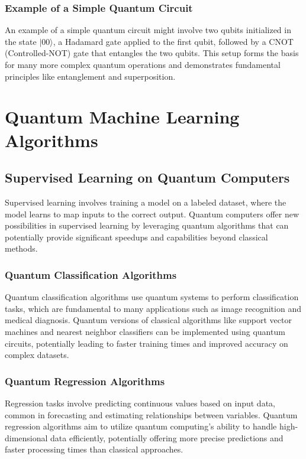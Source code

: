 \documentclass{book}
\begin{document}
\subsubsection{Example of a Simple Quantum Circuit}
An example of a simple quantum circuit might involve two qubits initialized in the state $|00\rangle$, a Hadamard gate applied to the first qubit, followed by a CNOT (Controlled-NOT) gate that entangles the two qubits. This setup forms the basis for many more complex quantum operations and demonstrates fundamental principles like entanglement and superposition.

\section{Quantum Machine Learning Algorithms}

\subsection{Supervised Learning on Quantum Computers}
Supervised learning involves training a model on a labeled dataset, where the model learns to map inputs to the correct output. Quantum computers offer new possibilities in supervised learning by leveraging quantum algorithms that can potentially provide significant speedups and capabilities beyond classical methods.

\subsubsection{Quantum Classification Algorithms}
Quantum classification algorithms use quantum systems to perform classification tasks, which are fundamental to many applications such as image recognition and medical diagnosis. Quantum versions of classical algorithms like support vector machines and nearest neighbor classifiers can be implemented using quantum circuits, potentially leading to faster training times and improved accuracy on complex datasets.

\subsubsection{Quantum Regression Algorithms}
Regression tasks involve predicting continuous values based on input data, common in forecasting and estimating relationships between variables. Quantum regression algorithms aim to utilize quantum computing's ability to handle high-dimensional data efficiently, potentially offering more precise predictions and faster processing times than classical approaches.
\end{document}
